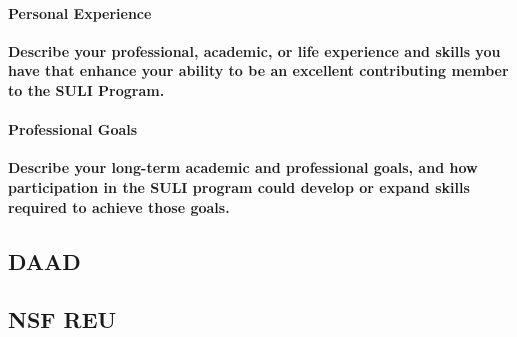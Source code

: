 \paragraph{Personal Experience}
\textbf{Describe your professional, academic, or life experience and skills you have that enhance your ability to be an excellent contributing member to the SULI Program.}



\paragraph{Professional Goals}
\textbf{Describe your long-term academic and professional goals, and how participation in the SULI program could develop or expand skills required to achieve those goals.}

\subsection{DAAD}



\subsection{NSF REU}
